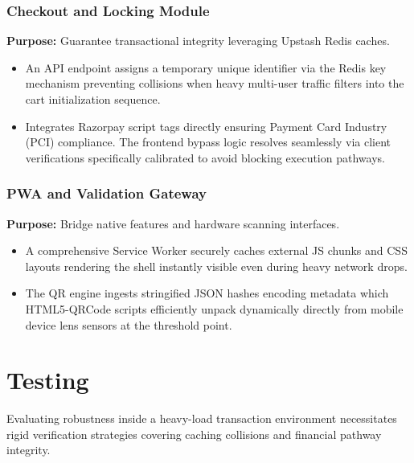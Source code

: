 \documentclass[12pt,a4paper]{report}
\begin{document}
\subsection{Checkout and Locking Module}
\textbf{Purpose:} Guarantee transactional integrity leveraging Upstash Redis caches.
\begin{itemize}
    \item An API endpoint assigns a temporary unique identifier via the Redis key mechanism preventing collisions when heavy multi-user traffic filters into the cart initialization sequence.
    \item Integrates Razorpay script tags directly ensuring Payment Card Industry (PCI) compliance. The frontend bypass logic resolves seamlessly via client verifications specifically calibrated to avoid blocking execution pathways.
\end{itemize}

\subsection{PWA and Validation Gateway}
\textbf{Purpose:} Bridge native features and hardware scanning interfaces.
\begin{itemize}
    \item A comprehensive Service Worker securely caches external JS chunks and CSS layouts rendering the shell instantly visible even during heavy network drops.
    \item The QR engine ingests stringified JSON hashes encoding metadata which HTML5-QRCode scripts efficiently unpack dynamically directly from mobile device lens sensors at the threshold point. 
\end{itemize}

\chapter{Testing}

Evaluating robustness inside a heavy-load transaction environment necessitates rigid verification strategies covering caching collisions and financial pathway integrity. 
\end{document}
